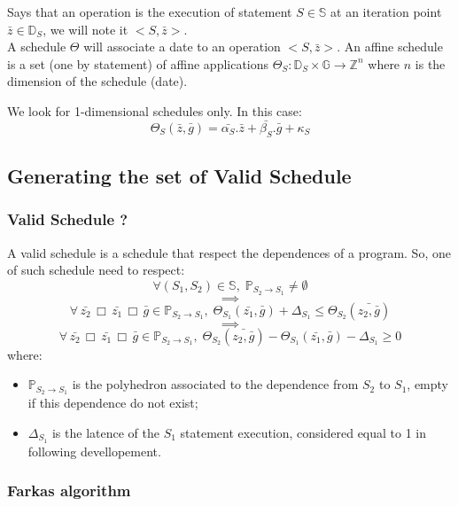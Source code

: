	Says  that an operation is the execution of statement $S \in \mathbb{S}$ at an iteration point 
$\bar{z} \in \mathbb{D}_{S}$, we will note it $<\!S, \bar{z}\!>$.\\
	A schedule $\Theta$ will associate a date to an operation $<\!S, \bar{z}\!>$. An affine schedule is a set (one
by statement) of affine applications $\Theta_{S}: \mathbb{D}_{S} \times \mathbb{G} \rightarrow \mathbb{Z}^{n}$ where $n$
is the dimension of the schedule (date).

	We look for 1-dimensional schedules only. In this case:
$$\Theta_{S}(\bar{z}, \bar{g}) = \bar{\alpha_{S}} . \bar{z} + \bar{\beta_{S}} . \bar{g} + \kappa_{S}$$

		\subsection{Generating the set of Valid Schedule}
		\label{polyhedric:schedule:vss}

			\subsubsection{Valid Schedule ?}
			\label{polyhedric:schedule:vss:vss}
			
	A valid schedule is a schedule that respect the dependences of a program. So, one of such schedule need to respect:
	$$ \forall (S_{1}, S_{2}) \in \mathbb{S}, \; \mathbb{P}_{S_{2} \rightarrow S_{1}} \neq \emptyset $$
	$$ \implies $$
	$$ \forall \, \bar{z_{2}} \,\Box\, \bar{z_{1}} \,\Box\, \bar{g} \in \mathbb{P}_{S_{2} \rightarrow S_{1}}, \; 
	\Theta_{S_{1}}(\bar{z_{1}}, \bar{g}) + \Delta_{S_{1}} \leq \Theta_{S_{2}}(\bar{z_{2}, \bar{g}}) $$
	$$ \implies $$
	$$ \forall \, \bar{z_{2}} \,\Box\, \bar{z_{1}} \,\Box\, \bar{g} \in \mathbb{P}_{S_{2} \rightarrow S_{1}}, \; 
	\Theta_{S_{2}}(\bar{z_{2}, \bar{g}}) - \Theta_{S_{1}}(\bar{z_{1}}, \bar{g}) - \Delta_{S_{1}} \geq 0 $$
	where:
\begin{itemize}
	\item $ \mathbb{P}_{S_{2} \rightarrow S_{1}} $ is the polyhedron associated to the dependence from $S_{2}$ to $S_{1}$,
	empty if this dependence do not exist;
	\item $ \Delta_{S_{1}} $ is the latence of the $S_{1}$ statement execution, considered equal to 1 in following
	devellopement.
\end{itemize}

			\subsubsection{Farkas algorithm}
			\label{polyhedric:schedule:vss:farkas}

